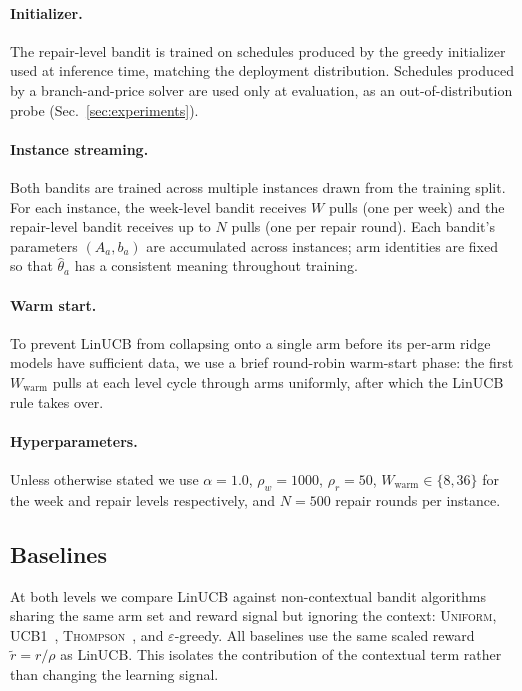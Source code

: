 \documentclass{article}
\begin{document}
\paragraph{Initializer.}
The repair-level bandit is trained on schedules produced by the greedy
initializer used at inference time, matching the deployment distribution.
Schedules produced by a branch-and-price solver are used only at
evaluation, as an out-of-distribution probe (Sec.~\ref{sec:experiments}).

\paragraph{Instance streaming.}
Both bandits are trained across multiple instances drawn from the training
split. For each instance, the week-level bandit receives $W$ pulls (one per
week) and the repair-level bandit receives up to $N$ pulls (one per repair
round). Each bandit's parameters $(A_a, b_a)$ are accumulated across
instances; arm identities are fixed so that $\hat{\theta}_a$ has a
consistent meaning throughout training.

\paragraph{Warm start.}
To prevent LinUCB from collapsing onto a single arm before its per-arm ridge
models have sufficient data, we use a brief round-robin warm-start phase:
the first $W_{\text{warm}}$ pulls at each level cycle through arms
uniformly, after which the LinUCB rule takes over.

\paragraph{Hyperparameters.}
Unless otherwise stated we use $\alpha = 1.0$, $\rho_w = 1000$,
$\rho_r = 50$, $W_{\text{warm}} \in \{8, 36\}$ for the week and repair
levels respectively, and $N = 500$ repair rounds per instance.

\subsection{Baselines}

At both levels we compare LinUCB against non-contextual bandit algorithms
sharing the same arm set and reward signal but ignoring the context:
\textsc{Uniform}, \textsc{UCB1}~\citep{auer2002finitetime},
\textsc{Thompson}~\citep{thompson1933likelihood,agrawal2013thompson}, and
$\varepsilon$-greedy. All baselines use the same scaled reward
$\tilde{r} = r/\rho$ as LinUCB. This isolates the contribution of the
contextual term rather than changing the learning signal.
\end{document}
